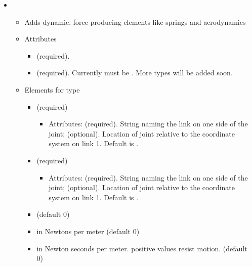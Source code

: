 \begin{itemize}
\item {}
\begin{itemize}
\item Adds dynamic, force-producing elements like springs and
  aerodynamics
\item Attributes
\begin{itemize}
\item {} (required).
\item {} (required).  Currently must be
  .  More types will be added soon.
\end{itemize}
\item Elements for type 
\begin{itemize}
\item {} (required)  
\begin{itemize}
\item Attributes:  (required). String naming the link on
  one side of the joint;  (optional). Location of joint relative to the coordinate system on link 1. Default is .
\end{itemize}
\item {} (required)
\begin{itemize}
\item Attributes:  (required). String naming the link on
  one side of the joint;  (optional). Location of joint relative to the coordinate system on link 1. Default is .
\end{itemize}
\item {} (default 0)
\item {} in Newtons per meter (default 0)
\item {} in Newton seconds per meter.  positive values resist motion.  (default 0)
\end{itemize}
\end{itemize}

\end{itemize}
